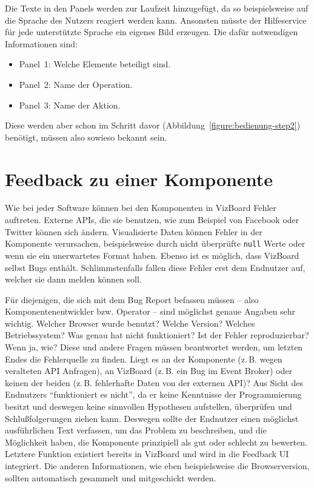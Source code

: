 \documentclass[
	headsepline,
	footsepline,
	fontsize=12pt,
	bibliography=totoc
]{scrbook}
\begin{document}
Die Texte in den Panels werden zur Laufzeit hinzugefügt, da so beispielsweise auf die Sprache des Nutzers reagiert werden kann. Ansonsten müsste der Hilfeservice für jede unterstützte Sprache ein eigenes Bild erzeugen. Die dafür notwendigen Informationen sind:

\begin{itemize}
	\item Panel~1: Welche Elemente beteiligt sind.
	\item Panel~2: Name der Operation.
	\item Panel~3: Name der Aktion.
\end{itemize}

Diese werden aber schon im Schritt davor (Abbildung~\ref{figure:bedienung-step2}) benötigt, müssen also sowieso bekannt sein.

\section{Feedback zu einer Komponente}
\label{section:konzeption:feedback}

Wie bei jeder Software können bei den Komponenten in VizBoard Fehler auftreten. Externe APIs, die sie benutzen, wie zum Beispiel von Facebook oder Twitter können sich ändern. Visualisierte Daten können Fehler in der Komponente verursachen, beispielsweise durch nicht überprüfte \texttt{null} Werte oder wenn sie ein unerwartetes Format haben. Ebenso ist es möglich, dass VizBoard selbst Bugs enthält. Schlimmstenfalls fallen diese Fehler erst dem Endnutzer auf, welcher sie dann melden können soll.

Für diejenigen, die sich mit dem Bug Report befassen müssen -- also Komponentenentwickler bzw. Operator -- sind möglichst genaue Angaben sehr wichtig. Welcher Browser wurde benutzt? Welche Version? Welches Betriebssystem? Was genau hat nicht funktioniert? Ist der Fehler reproduzierbar? Wenn ja, wie? Diese und andere Fragen müssen beantwortet werden, um letzten Endes die Fehlerquelle zu finden. Liegt es an der Komponente (z.\,B. wegen veralteten API Anfragen), an VizBoard (z.\,B. ein Bug im Event Broker) oder keinen der beiden (z.\,B. fehlerhafte Daten von der externen API)? Aus Sicht des Endnutzers \enquote{funktioniert es nicht}, da er keine Kenntnisse der Programmierung besitzt und deswegen keine sinnvollen Hypothesen aufstellen, überprüfen und Schlußfolgerungen ziehen kann. Deswegen sollte der Endnutzer einen möglichst ausführlichen Text verfassen, um das Problem zu beschreiben, und die Möglichkeit haben, die Komponente prinzipiell als gut oder schlecht zu bewerten. Letztere Funktion existiert bereits in VizBoard und wird in die Feedback UI integriert. Die anderen Informationen, wie eben beispielsweise die Browserversion, sollten automatisch gesammelt und mitgeschickt werden.
\end{document}
